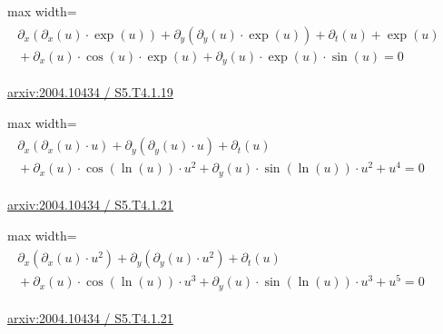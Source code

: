 \documentclass[10pt,a4paper]{article}
\begin{document}
\begin{minipage}{\linewidth}
\begin{center}\begin{adjustbox}{max width=\linewidth}$\displaystyle\begin{gathered}\begin{gathered}\partial_{x}(\partial_{x}(u)\cdot \exp(u))+\partial_{y}(\partial_{y}(u)\cdot \exp(u))+\partial_{t}(u)+\exp(u)\\[-1pt]{}+\partial_{x}(u)\cdot \cos(u)\cdot \exp(u)+\partial_{y}(u)\cdot \exp(u)\cdot \sin(u)=0\end{gathered}\end{gathered}$\end{adjustbox}\end{center}
{\small \href{https://arxiv.org/html/2004.10434#S5.T4.1.19}{arxiv:2004.10434 / S5.T4.1.19}}\par
\end{minipage}\par\vspace{7mm}

\begin{minipage}{\linewidth}
\begin{center}\begin{adjustbox}{max width=\linewidth}$\displaystyle\begin{gathered}\begin{gathered}\partial_{x}(\partial_{x}(u)\cdot u)+\partial_{y}(\partial_{y}(u)\cdot u)+\partial_{t}(u)\\[-1pt]{}+\partial_{x}(u)\cdot \cos(\ln(u))\cdot u^{2}+\partial_{y}(u)\cdot \sin(\ln(u))\cdot u^{2}+u^{4}=0\end{gathered}\end{gathered}$\end{adjustbox}\end{center}
{\small \href{https://arxiv.org/html/2004.10434#S5.T4.1.21}{arxiv:2004.10434 / S5.T4.1.21}}\par
\end{minipage}\par\vspace{7mm}

\begin{minipage}{\linewidth}
\begin{center}\begin{adjustbox}{max width=\linewidth}$\displaystyle\begin{gathered}\begin{gathered}\partial_{x}(\partial_{x}(u)\cdot u^{2})+\partial_{y}(\partial_{y}(u)\cdot u^{2})+\partial_{t}(u)\\[-1pt]{}+\partial_{x}(u)\cdot \cos(\ln(u))\cdot u^{3}+\partial_{y}(u)\cdot \sin(\ln(u))\cdot u^{3}+u^{5}=0\end{gathered}\end{gathered}$\end{adjustbox}\end{center}
{\small \href{https://arxiv.org/html/2004.10434#S5.T4.1.21}{arxiv:2004.10434 / S5.T4.1.21}}\par
\end{minipage}\par\vspace{7mm}
\end{document}
